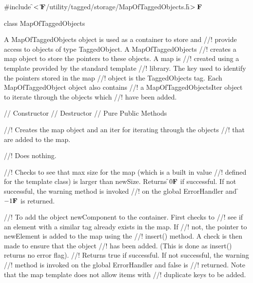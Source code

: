 
\indent \#include \f$<\tilde{ }{\bf F}$/utility/tagged/storage/MapOfTaggedObjects.h\f$>{\bf F}$

\indent class MapOfTaggedObjects

\indent{}

\indent A MapOfTaggedObjects object is used as a container to store and
//! provide access to objects of type TaggedObject. A MapOfTaggedObjects
//! creates a map object to store the pointers to these objects. A map is
//! created using a template provided by the standard template
//! library. The key used to identify the pointers stored in the map
//! object is the TaggedObjects tag. Each MapOfTaggedObject object also contains
//! a MapOfTaggedObjectsIter object to iterate through the objects which
//! have been added. 

\indent // Constructor
\indent // Destructor
\indent // Pure Public Methods

//! Creates the map object and an iter for iterating through the objects
//! that are added to the map.

//! Does nothing.

//! Checks to see that max size for the map (which is a built in value
//! defined for the template class) is larger than \p newSize. Returns
\f$0{\bf F}$ if successful. If not successful, the warning method is invoked
//! on the global ErrorHandler and \f$-1{\bf F}$ is returned.

//! To add the object \p newComponent to the container. First checks to
//! see if an element with a similar tag already exists in the map. If
//! not, the pointer to \p newElement is added to the map using the
//! insert() method. A check is then made to ensure that the object
//! has been added. (This is done as insert() returns no error flag).
//! Returns \p true if successful. If not successful, the warning
//! method is invoked on the global ErrorHandler and \p false is
//! returned. Note that the map template does not allow items with
//! duplicate keys to be added. 
 
